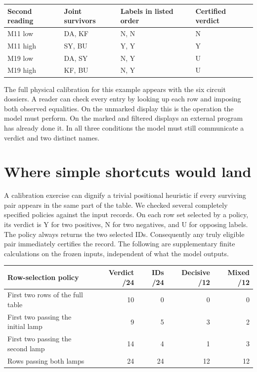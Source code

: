 \documentclass[12pt,letterpaper]{article}
\begin{document}
\begin{center}\begin{tabular}{@{}llll@{}}\toprule
Second reading & Joint survivors & Labels in listed order & Certified verdict\\\midrule
M11 low  & DA, KF & N, N & N\\
M11 high & SY, BU & Y, Y & Y\\
M19 low  & DA, SY & N, Y & U\\
M19 high & KF, BU & N, Y & U\\\bottomrule
\end{tabular}\end{center}
The full physical calibration for this example appears with the six circuit dossiers. A reader can check every entry by looking up each row and imposing both observed equalities. On the unmarked display this is the operation the model must perform. On the marked and filtered displays an external program has already done it. In all three conditions the model must still communicate a verdict and two distinct names.


\section{Where simple shortcuts would land}

A calibration exercise can dignify a trivial positional heuristic if every surviving pair appears in the same part of the table. We checked several completely specified policies against the input records. On each row set selected by a policy, its verdict is Y for two positives, N for two negatives, and U for opposing labels. The policy always returns the two selected IDs. Consequently any truly eligible pair immediately certifies the record. The following are supplementary finite calculations on the frozen inputs, independent of what the model outputs.

\begin{center}\small
\begin{tabularx}{\linewidth}{@{}Yrrrr@{}}\toprule
Row-selection policy & Verdict /24 & IDs /24 & Decisive /12 & Mixed /12\\\midrule
First two rows of the full table & 10 & 0 & 0 & 0\\
First two passing the initial lamp & 9 & 5 & 3 & 2\\
First two passing the second lamp & 14 & 4 & 1 & 3\\
Rows passing both lamps & 24 & 24 & 12 & 12\\\bottomrule
\end{tabularx}\end{center}
\end{document}
